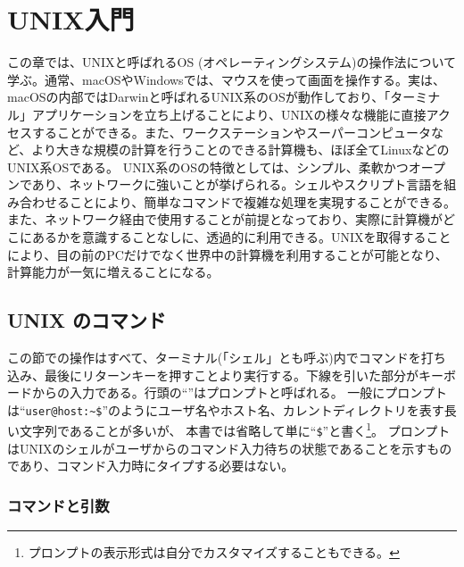 \chapter{UNIX入門}

\noindent
この章では、UNIXと呼ばれるOS (オペレーティングシステム)の操作法について学ぶ。通常、macOSやWindowsでは、マウスを使って画面を操作する。実は、macOSの内部ではDarwinと呼ばれるUNIX系のOSが動作しており、「ターミナル」アプリケーションを立ち上げることにより、UNIXの様々な機能に直接アクセスすることができる。また、ワークステーションやスーパーコンピュータなど、より大きな規模の計算を行うことのできる計算機も、ほぼ全てLinuxなどのUNIX系OSである。
UNIX系のOSの特徴としては、シンプル、柔軟かつオープンであり、ネットワークに強いことが挙げられる。シェルやスクリプト言語を組み合わせることにより、簡単なコマンドで複雑な処理を実現することができる。また、ネットワーク経由で使用することが前提となっており、実際に計算機がどこにあるかを意識することなしに、透過的に利用できる。UNIXを取得することにより、目の前のPCだけでなく世界中の計算機を利用することが可能となり、計算能力が一気に増えることになる。

\section{UNIX のコマンド}

この節での操作はすべて、ターミナル(「シェル」とも呼ぶ)内でコマンドを打ち込み、最後にリターンキーを押すことより実行する。下線を引いた部分がキーボードからの入力である。行頭の``\texttt{\promptn}''はプロンプトと呼ばれる。
一般にプロンプトは``\texttt{user@host:\~{}\$}''のようにユーザ名やホスト名、カレントディレクトリを表す長い文字列であることが多いが、
本書では省略して単に``\texttt{\$}''と書く\footnote{プロンプトの表示形式は自分でカスタマイズすることもできる。}。
プロンプトはUNIXのシェルがユーザからのコマンド入力待ちの状態であることを示すものであり、コマンド入力時にタイプする必要はない。

\subsection{コマンドと引数}
\label{sec:unix:command}

